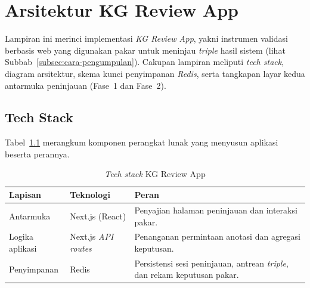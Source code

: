 \documentclass[main]{subfiles}
\begin{document}
\ifSubfilesClassLoaded{}{\appendix\setcounter{chapter}{1}}

\chapter{Arsitektur KG Review App}
\label{lamp:kg-review-app}

Lampiran ini merinci implementasi \textit{KG Review App}, yakni instrumen
validasi berbasis web yang digunakan pakar untuk meninjau \textit{triple}
hasil sistem (lihat Subbab~\ref{subsec:cara-pengumpulan}). Cakupan lampiran
meliputi \textit{tech stack}, diagram arsitektur, skema kunci penyimpanan
\textit{Redis}, serta tangkapan layar kedua antarmuka peninjauan (Fase~1 dan
Fase~2).

\section{Tech Stack}
\label{lamp:tech-stack}

Tabel~\ref{tab:tech-stack} merangkum komponen perangkat lunak yang
menyusun aplikasi beserta perannya.

\begin{table}[htbp]
  \centering
  \caption{\textit{Tech stack} KG Review App}
  \label{tab:tech-stack}
  \begin{tabularx}{\linewidth}{@{}l l X@{}}
    \toprule
    \textbf{Lapisan} & \textbf{Teknologi} & \textbf{Peran} \\
    \midrule
    Antarmuka      & Next.js (React) & Penyajian halaman peninjauan dan
                     interaksi pakar. \\
    Logika aplikasi & Next.js \textit{API routes} & Penanganan permintaan
                     anotasi dan agregasi keputusan. \\
    Penyimpanan    & Redis & Persistensi sesi peninjauan, antrean
                     \textit{triple}, dan rekam keputusan pakar. \\
    \bottomrule
  \end{tabularx}
\end{table}
\end{document}
